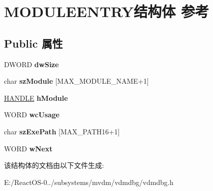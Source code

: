 \hypertarget{struct_m_o_d_u_l_e_e_n_t_r_y}{}\section{M\+O\+D\+U\+L\+E\+E\+N\+T\+R\+Y结构体 参考}
\label{struct_m_o_d_u_l_e_e_n_t_r_y}
\subsection*{Public 属性}
\begin{DoxyCompactItemize}
\item 
\mbox{\label{struct_m_o_d_u_l_e_e_n_t_r_y_ac9ac87193128c4cc99e1d936b3d2f576}} 
D\+W\+O\+RD {\bfseries dw\+Size}
\item 
\mbox{\label{struct_m_o_d_u_l_e_e_n_t_r_y_a17eb301d3e24b5c59d0e15eab3a086bf}} 
char {\bfseries sz\+Module} \mbox{[}M\+A\+X\+\_\+\+M\+O\+D\+U\+L\+E\+\_\+\+N\+A\+ME+1\mbox{]}
\item 
\mbox{\label{struct_m_o_d_u_l_e_e_n_t_r_y_ab01cce0aa0b5f5abbf811b38d1cf6d3f}} 
\hyperlink{interfacevoid}{H\+A\+N\+D\+LE} {\bfseries h\+Module}
\item 
\mbox{\label{struct_m_o_d_u_l_e_e_n_t_r_y_a1446f4c7f129d689ac6302f46a96172c}} 
W\+O\+RD {\bfseries wc\+Usage}
\item 
\mbox{\label{struct_m_o_d_u_l_e_e_n_t_r_y_a0a3550ca41b4d777ab6fe23d7b1bc384}} 
char {\bfseries sz\+Exe\+Path} \mbox{[}M\+A\+X\+\_\+\+P\+A\+T\+H16+1\mbox{]}
\item 
\mbox{\label{struct_m_o_d_u_l_e_e_n_t_r_y_a0f9e5db71ac6df7be45002859aa6d294}} 
W\+O\+RD {\bfseries w\+Next}
\end{DoxyCompactItemize}


该结构体的文档由以下文件生成\+:\begin{DoxyCompactItemize}
\item 
E\+:/\+React\+O\+S-\/0../subsystems/mvdm/vdmdbg/vdmdbg.\+h\end{DoxyCompactItemize}
